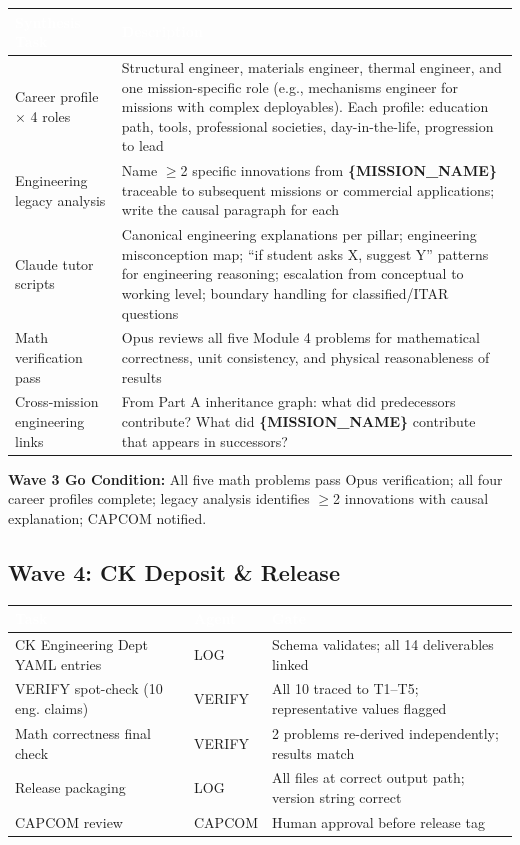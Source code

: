\documentclass[11pt,letterpaper]{article}
\newcommand{\param}[1]{\textcolor{paramred}{\textbf{\{#1\}}}}
\newcommand{\tableheader}[1]{\textbf{\sffamily\textcolor{white}{#1}}}
\begin{document}
\begin{center}
\begin{tabularx}{\textwidth}{L{4cm}X}
\toprule
{}
\tableheader{Synthesis Task} & \tableheader{Description} \\
\midrule
Career profile $\times$ 4 roles & Structural engineer, materials engineer, thermal engineer, and one mission-specific role (e.g., mechanisms engineer for missions with complex deployables). Each profile: education path, tools, professional societies, day-in-the-life, progression to lead \\
Engineering legacy analysis & Name $\geq$2 specific innovations from \param{MISSION\_NAME} traceable to subsequent missions or commercial applications; write the causal paragraph for each \\
Claude tutor scripts & Canonical engineering explanations per pillar; engineering misconception map; ``if student asks X, suggest Y'' patterns for engineering reasoning; escalation from conceptual to working level; boundary handling for classified/ITAR questions \\
Math verification pass & Opus reviews all five Module 4 problems for mathematical correctness, unit consistency, and physical reasonableness of results \\
Cross-mission engineering links & From Part A inheritance graph: what did predecessors contribute? What did \param{MISSION\_NAME} contribute that appears in successors? \\
\bottomrule
\end{tabularx}
\end{center}

\textbf{Wave 3 Go Condition:} All five math problems pass Opus verification; all four career profiles complete; legacy analysis identifies $\geq$2 innovations with causal explanation; CAPCOM notified.

\subsection{Wave 4: CK Deposit \& Release}

\begin{center}
\begin{tabularx}{\textwidth}{L{4cm}C{2cm}X}
\toprule
{}
\tableheader{Task} & \tableheader{Agent} & \tableheader{Gate} \\
\midrule
CK Engineering Dept YAML entries & LOG & Schema validates; all 14 deliverables linked \\
VERIFY spot-check (10 eng. claims) & VERIFY & All 10 traced to T1--T5; representative values flagged \\
Math correctness final check & VERIFY & 2 problems re-derived independently; results match \\
Release packaging & LOG & All files at correct output path; version string correct \\
CAPCOM review & CAPCOM & Human approval before release tag \\
\bottomrule
\end{tabularx}
\end{center}
\end{document}
